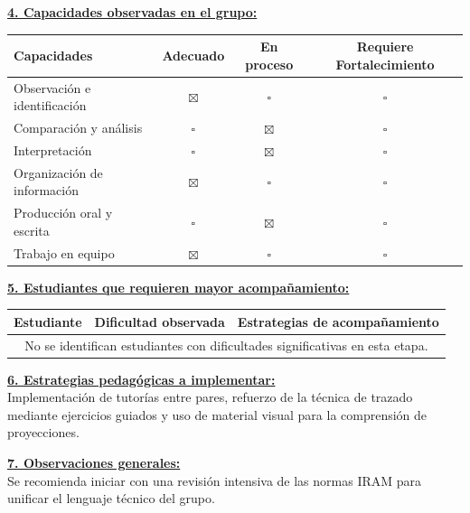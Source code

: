 \documentclass[a4paper]{article}
\begin{document}
\vspace{0.5cm}
\noindent\textbf{\underline{4. Capacidades observadas en el grupo:}}\\
\begin{center}
\begin{tabular}{|l|c|c|c|}
\hline
\rowcolor{gray!20}\fontsize{8pt}{10pt}\selectfont Capacidades & Adecuado & En proceso & Requiere Fortalecimiento \\ \hline
\fontsize{8pt}{10pt}\selectfont Observación e identificación & $\boxtimes$ & $\square$ & $\square$ \\ \hline
\fontsize{8pt}{10pt}\selectfont Comparación y análisis & $\square$ & $\boxtimes$ & $\square$ \\ \hline
\fontsize{8pt}{10pt}\selectfont Interpretación & $\square$ & $\boxtimes$ & $\square$ \\ \hline
\fontsize{8pt}{10pt}\selectfont Organización de información & $\boxtimes$ & $\square$ & $\square$ \\ \hline
\fontsize{8pt}{10pt}\selectfont Producción oral y escrita & $\square$ & $\boxtimes$ & $\square$ \\ \hline
\fontsize{8pt}{10pt}\selectfont Trabajo en equipo & $\boxtimes$ & $\square$ & $\square$ \\ \hline
\end{tabular}
\end{center}

\vspace{0.5cm}
\noindent\textbf{\underline{5. Estudiantes que requieren mayor acompañamiento:}}\\
\begin{center}
\begin{tabular}{|l|l|l|}
\hline
\rowcolor{gray!20} Estudiante & Dificultad observada & Estrategias de acompañamiento \\ \hline
\multicolumn{3}{|c|}{No se identifican estudiantes con dificultades significativas en esta etapa.} \\ \hline
\end{tabular}
\end{center}

\vspace{0.5cm}
\noindent\textbf{\underline{6. Estrategias pedagógicas a implementar:}}\\
\fontsize{11pt}{13pt}\selectfont Implementación de tutorías entre pares, refuerzo de la técnica de trazado mediante ejercicios guiados y uso de material visual para la comprensión de proyecciones.

\vspace{0.5cm}
\noindent\textbf{\underline{7. Observaciones generales:}}\\
\fontsize{11pt}{13pt}\selectfont Se recomienda iniciar con una revisión intensiva de las normas IRAM para unificar el lenguaje técnico del grupo.
\end{document}
